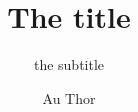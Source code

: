 \author{Au Thor}
\title{The title}
\subtitle{the subtitle}

\renewcommand{\lsSeries}{}
\newcommand{\lsSeriesTitle}{}
\newcommand{\lsSeriesColor}{gray}
\renewcommand{\lsSeriesNumber}{}



